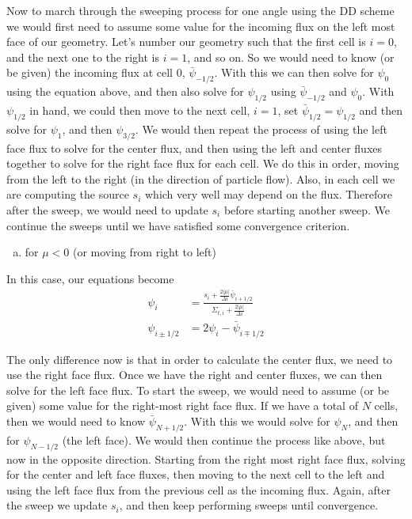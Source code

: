\documentclass[10pt]{article}
\begin{document}
Now to march through the sweeping process for one angle using the DD scheme we would first need to assume some value for the incoming flux on the left most face of our geometry. Let's number our geometry such that the first cell is $i=0$, and the next one to the right is $i=1$, and so on. So we would need to know (or be given) the incoming flux at cell 0, $\bar{\psi}_{-1/2}$. With this we can then solve for $\psi_0$ using the equation above, and then also solve for $\psi_{1/2}$ using $\bar{\psi}_{-1/2}$ and $\psi_0$. With $\psi_{1/2}$ in hand, we could then move to the next cell, $i=1$, set $\bar{\psi}_{1/2} = \psi_{1/2}$ and then solve for $\psi_1$, and then $\psi_{3/2}$. We would then repeat the process of using the left face flux to solve for the center flux, and then using the left and center fluxes together to solve for the right face flux for each cell. We do this in order, moving from the left to the right (in the direction of particle flow). Also, in each cell we are computing the source $s_i$ which very well may depend on the flux. Therefore after the sweep, we would need to update $s_i$ before starting another sweep. We continue the sweeps until we have satisfied some convergence criterion.

%
%
%

\vspace{40pt}
\begin{enumerate}[(b)]
\item for $\mu < 0$ (or moving from right to left)
\end{enumerate}

In this case, our equations become
%
\begin{align*}
\psi_{i} &= \frac{s_{i} + \frac{2|\mu|}{\Delta i}\bar{\psi}_{i+1/2}}{\Sigma_{t,i} + \frac{2|\mu|}{\Delta i}} \\
\psi_{i\pm1/2} &= 2\psi_{i} - \bar{\psi}_{i\mp1/2}
\end{align*}

The only difference now is that in order to calculate the center flux, we need to use the right face flux. Once we have the right and center fluxes, we can then solve for the left face flux. To start the sweep, we would need to assume (or be given) some value for the right-most right face flux. If we have a total of $N$ cells, then we would need to know $\bar{\psi}_{N+1/2}$. With this we would solve for $\psi_N$, and then for $\psi_{N-1/2}$ (the left face). We would then continue the process like above, but now in the opposite direction. Starting from the right most right face flux, solving for the center and left face fluxes, then moving to the next cell to the left and using the left face flux from the previous cell as the incoming flux. Again, after the sweep we update $s_i$, and then keep performing sweeps until convergence.
\end{document}

